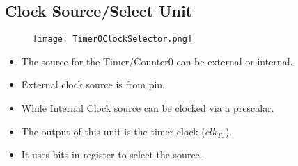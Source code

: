 \subsection{Clock Source/Select Unit}
\begin{figure}[H]
    \begin{center}
        \texttt{[image: Timer0ClockSelector.png]}
    \end{center}
\end{figure}
\begin{itemize}
    \item The source for the Timer/Counter0 can be external or internal.
    \item External clock source is from  pin.
    \item While Internal Clock source can be clocked via a prescalar.
    \item The output of this unit is the timer clock ($clk_{T1}$).
    \item It uses  bits in  register to select the source.
\end{itemize}


